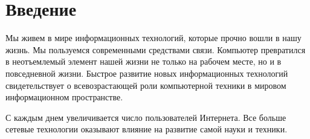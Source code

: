 \section{Введение}

Мы живем в мире информационных технологий, которые прочно вошли
в нашу жизнь. Мы пользуемся современными средствами связи.
Компьютер превратился в неотъемлемый элемент нашей жизни не только
на рабочем месте, но и в повседневной жизни. Быстрое развитие новых
информационных технологий свидетельствует о всевозрастающей роли
компьютерной техники в мировом информационном пространстве.

С каждым днем увеличивается число пользователей Интернета. Все
больше сетевые технологии оказывают влияние на развитие самой науки
и техники.



